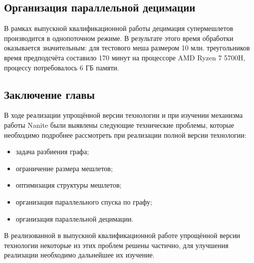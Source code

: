 \subsection*{Организация параллельной децимации}
В рамках выпускной квалификационной работы децимация супермешлетов производится в однопоточном режиме.
В результате этого время обработки оказывается значительным: для тестового меша размером 10 млн. треугольников время предподсчёта составило 170 минут на процессоре AMD Ryzen 7 5700H, процессу потребовалось 6 ГБ памяти.

\subsection*{Заключение главы}
В ходе реализации упрощённой версии технологии и при изучении механизма работы Nanite были выявлены следующие технические проблемы, которые необходимо подробнее рассмотреть при реализации полной версии технологии:
\begin{itemize}
    \item задача разбиения графа;
    \item ограничение размера мешлетов;
    \item оптимизация структуры мешлетов;
    \item организация параллельного спуска по графу;
    \item организация параллельной децимации.
\end{itemize}

В реализованной в выпускной квалификационной работе упрощённой версии технологии некоторые из этих проблем решены частично, для улучшения реализации необходимо дальнейшее их изучение.

